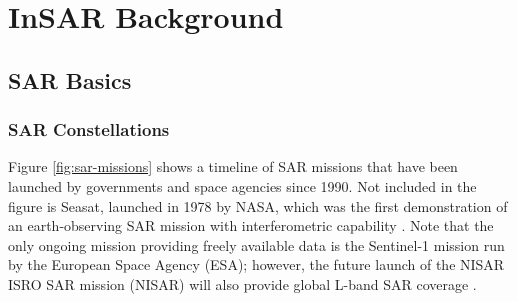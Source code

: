 \documentclass{utexasthesis}
\begin{document}
\chapter{InSAR Background}
\label{CHAP:3}


\section{SAR Basics}
\label{CHAP:3-sar}








\subsection{SAR Constellations}


Figure \ref{fig:sar-missions} shows a timeline of SAR missions that have been launched by governments and space agencies since 1990. Not included in the figure is Seasat, launched in 1978 by NASA, which was the first demonstration of an earth-observing SAR mission with interferometric capability \cite{Born1979SeasatMissionOverview, Gabriel1989MappingSmallElevation}. Note that the only ongoing mission providing freely available data is the Sentinel-1 mission run by the European Space Agency (ESA); however, the future launch of the NISAR ISRO SAR mission (NISAR) will also provide global L-band SAR coverage \cite{Rosen2015NasaIsroSar}.
\end{document}
